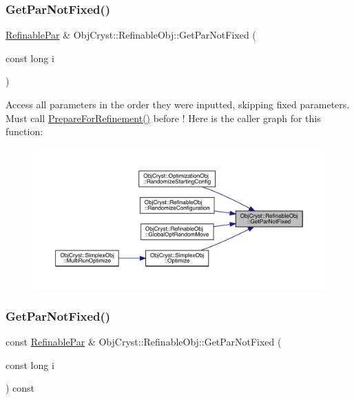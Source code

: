 \subsubsection{\texorpdfstring{GetParNotFixed()}{GetParNotFixed()}\hspace{0.1cm}{\footnotesize\ttfamily [1/2]}}
{\footnotesize\ttfamily \mbox{\hyperlink{class_obj_cryst_1_1_refinable_par}{Refinable\+Par}} \& Obj\+Cryst\+::\+Refinable\+Obj\+::\+Get\+Par\+Not\+Fixed (\begin{DoxyParamCaption}\item[{const long}]{i }\end{DoxyParamCaption})}

Access all parameters in the order they were inputted, skipping fixed parameters. Must call \mbox{\hyperlink{class_obj_cryst_1_1_refinable_obj_a6710a75c0477b6ad7e42400cdc6f1c32}{Prepare\+For\+Refinement()}} before ! Here is the caller graph for this function\+:
\nopagebreak
\begin{figure}[H]
\begin{center}
\leavevmode
\includegraphics[width=350pt]{class_obj_cryst_1_1_refinable_obj_a77a4f8d1b3b1184ac92b1a4b55a7f77a_icgraph}
\end{center}
\end{figure}
\mbox{\label{class_obj_cryst_1_1_refinable_obj_af3e09ef3992170784583869922df4735}} 
\subsubsection{\texorpdfstring{GetParNotFixed()}{GetParNotFixed()}\hspace{0.1cm}{\footnotesize\ttfamily [2/2]}}
{\footnotesize\ttfamily const \mbox{\hyperlink{class_obj_cryst_1_1_refinable_par}{Refinable\+Par}} \& Obj\+Cryst\+::\+Refinable\+Obj\+::\+Get\+Par\+Not\+Fixed (\begin{DoxyParamCaption}\item[{const long}]{i }\end{DoxyParamCaption}) const}

